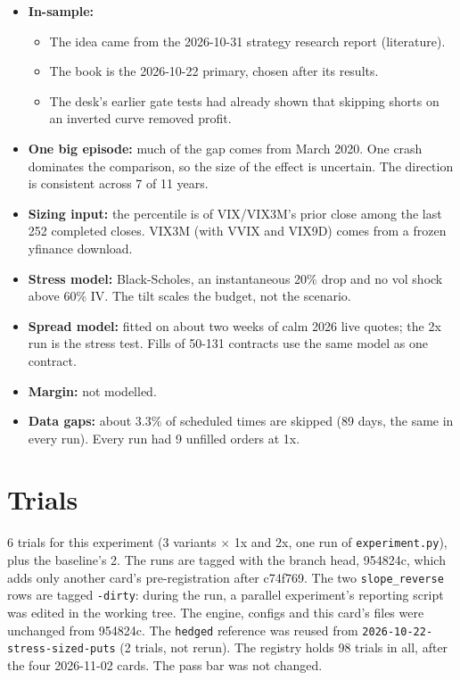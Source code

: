 \documentclass{article}
\begin{document}
\begin{itemize}

\item \textbf{In-sample:}

\begin{itemize}

\item The idea came from the 2026-10-31 strategy research report (literature).

\item The book is the 2026-10-22 primary, chosen after its results.

\item The desk's earlier gate tests had already shown that skipping shorts on an inverted curve removed profit.

\end{itemize}

\item \textbf{One big episode:} much of the gap comes from March 2020. One crash dominates the comparison, so the size of the effect is uncertain. The direction is consistent across 7 of 11 years.

\item \textbf{Sizing input:} the percentile is of VIX/\allowbreak{}VIX3M's prior close among the last 252 completed closes. VIX3M (with VVIX and VIX9D) comes from a frozen yfinance download.

\item \textbf{Stress model:} Black-Scholes, an instantaneous 20\% drop and no vol shock above 60\% IV. The tilt scales the budget, not the scenario.

\item \textbf{Spread model:} fitted on about two weeks of calm 2026 live quotes; the 2x run is the stress test. Fills of 50-131 contracts use the same model as one contract.

\item \textbf{Margin:} not modelled.

\item \textbf{Data gaps:} about 3.3\% of scheduled times are skipped (89 days, the same in every run). Every run had 9 unfilled orders at 1x.

\end{itemize}

\section{Trials}

6 trials for this experiment (3 variants \ensuremath{\times} 1x and 2x, one run of \texttt{experiment.\allowbreak{}py}), plus the baseline's 2. The runs are tagged with the branch head, 954824c, which adds only another card's pre-registration after c74f769. The two \texttt{slope\_\allowbreak{}reverse} rows are tagged \texttt{-\allowbreak{}dirty}: during the run, a parallel experiment's reporting script was edited in the working tree. The engine, configs and this card's files were unchanged from 954824c. The \texttt{hedged} reference was reused from \texttt{2026-\allowbreak{}10-\allowbreak{}22-\allowbreak{}stress-\allowbreak{}sized-\allowbreak{}puts} (2 trials, not rerun). The registry holds 98 trials in all, after the four 2026-11-02 cards. The pass bar was not changed.
\end{document}
